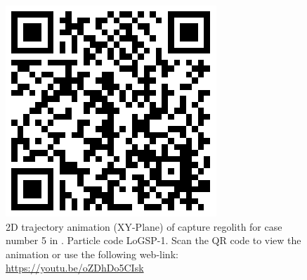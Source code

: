 \begin{figure}[htb]
\centering
\captionsetup{justification=centering}
\includegraphics[scale=0.2]{longest_edge_perturbations/3.2Density_1cmSize/qrcode_10ms_45Azimuth_315SolarPhase.png}
\caption{2D trajectory animation (XY-Plane) of capture regolith for case number 5 in . Particle code LoGSP-1. Scan the QR code to view the animation or use the following web-link: \url{https://youtu.be/oZDhDo5CIsk}}
\label{fig:LoGSP_1_capture_case_5_2d_trajectory_animation}
\end{figure}
\FloatBarrier
